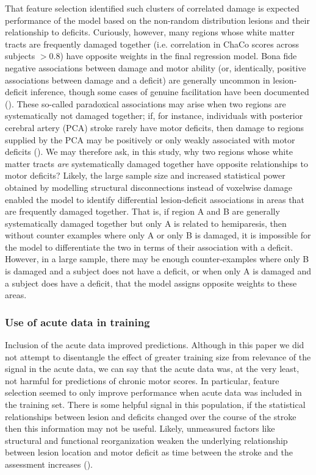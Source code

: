 \documentclass[10pt]{article}
\begin{document}
That feature selection identified such clusters of correlated damage is expected performance of the model based on the non-random distribution lesions and their relationship to deficits. Curiously, however, many regions whose white matter tracts are frequently damaged together (i.e. correlation in ChaCo scores across subjects $>$0.8) have opposite weights in the final regression model. Bona fide negative associations between damage and motor ability (or, identically, positive associations between damage and a deficit) are generally uncommon in lesion-deficit inference, though some cases of genuine facilitation have been documented (\cite{Kapur1996-xq, Sperber2020-kp}). These so-called paradoxical associations may arise when two regions are systematically not damaged together; if, for instance, individuals with posterior cerebral artery (PCA) stroke rarely have motor deficits, then damage to regions supplied by the PCA may be positively or only weakly associated with motor deficits (\cite{Sperber2020-kp}). We may therefore ask, in this study, why two regions whose white matter tracts \textit{are} systematically damaged together have opposite relationships to motor deficits? Likely, the large sample size and increased statistical power obtained by modelling structural disconnections instead of voxelwise damage enabled the model to identify differential lesion-deficit associations in areas that are frequently damaged together. That is, if region A and B are generally systematically damaged together but only A is related to hemiparesis, then without counter examples where only A or only B is damaged, it is impossible for the model to differentiate the two in terms of their association with a deficit. However, in a large sample, there may be enough counter-examples where only B is damaged and a subject does not have a deficit, or when only A is damaged and a subject does have a deficit, that the model assigns opposite weights to these areas. 


\subsubsection*{Use of acute data in training}
Inclusion of the acute data improved predictions. Although in this paper we did not attempt to disentangle the effect of greater training size from relevance of the signal in the acute data, we can say that the acute data was, at the very least, not harmful for predictions of chronic motor scores. In particular, feature selection seemed to only improve performance when acute data was included in the training set. There is some helpful signal in this population, if the statistical relationships between lesion and deficits changed over the course of the stroke then this information may not be useful. Likely, unmeasured factors like structural and functional reorganization weaken the underlying relationship between lesion location and motor deficit as time between the stroke and the assessment increases (\cite{Shahid2017-gx}). 
\end{document}
